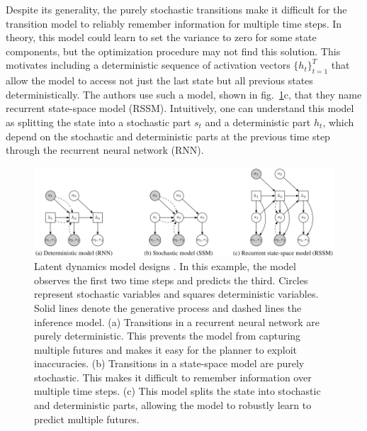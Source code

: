 Despite its generality, the purely stochastic transitions make it difficult for the transition model to reliably remember information for multiple time steps. In theory, this model could learn to set the variance to zero for some state components, but the optimization procedure may not find this solution. This motivates including a deterministic sequence of activation vectors $\{h_t\}^T_{t=1}$ that allow the model to access not just the last state but all previous states deterministically. The authors use such a model, shown in fig.~\ref{Fig.PlaNetModelDesignes}c, that they name recurrent state-space model (RSSM). Intuitively, one can understand this model as splitting the state into a stochastic part $s_t$ and a deterministic part $h_t$, which depend on the stochastic and deterministic parts at the previous time step through the recurrent neural network (RNN).

\begin{figure}[H]
\includegraphics[width=1.0\textwidth,keepaspectratio]{figures/PlaNet/models.png}
\caption[PlaNet latent dynamics model designs]{Latent dynamics model designs \protect\cite{Algo.PlaNet}. In this example, the model observes the first two time steps and predicts the third. Circles represent stochastic variables and squares deterministic variables. Solid lines denote the generative process and dashed lines the inference model. (a) Transitions in a recurrent neural network are purely deterministic. This prevents the model from capturing multiple futures and makes it easy for the planner to exploit inaccuracies. (b) Transitions in a state-space model are purely stochastic. This makes it difficult to remember information over multiple time steps. (c) This model splits the state into stochastic and deterministic parts, allowing the model to robustly learn to predict multiple futures.}
\label{Fig.PlaNetModelDesignes}
\end{figure}


